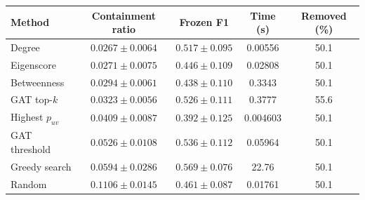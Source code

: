 \begin{tabular}{lcccc}
\toprule
Method & Containment ratio & Frozen F1 & Time (s) & Removed (\%) \\
\midrule
Degree & $0.0267 \pm 0.0064$ & $0.517 \pm 0.095$ & 0.00556 & 50.1 \\
Eigenscore & $0.0271 \pm 0.0075$ & $0.446 \pm 0.109$ & 0.02808 & 50.1 \\
Betweenness & $0.0294 \pm 0.0061$ & $0.438 \pm 0.110$ & 0.3343 & 50.1 \\
GAT top-$k$ & $0.0323 \pm 0.0056$ & $0.526 \pm 0.111$ & 0.3777 & 55.6 \\
Highest $p_{uv}$ & $0.0409 \pm 0.0087$ & $0.392 \pm 0.125$ & 0.004603 & 50.1 \\
GAT threshold & $0.0526 \pm 0.0108$ & $0.536 \pm 0.112$ & 0.05964 & 50.1 \\
Greedy search & $0.0594 \pm 0.0286$ & $0.569 \pm 0.076$ & 22.76 & 50.1 \\
Random & $0.1106 \pm 0.0145$ & $0.461 \pm 0.087$ & 0.01761 & 50.1 \\
\bottomrule
\end{tabular}
